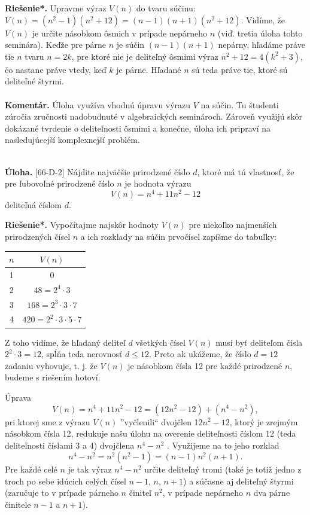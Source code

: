 \documentclass[11pt,a4paper,oneside,final]{book}
\newcommand{\kom}{\textbf{Komentár.} }
\newcommand{\ul}{\textbf{Úloha.} }
\newcommand{\rieh}{\textbf{Riešenie*.} }
\begin{document}
\rieh Upravme výraz $V(n)$ do tvaru súčinu: $V (n) = (n^2-1)(n^2+12)=(n-1)(n+1)(n^2+12)$. Vidíme, že $V(n)$ je určite násobkom ôsmich v prípade nepárneho $n$ (viď. tretia úloha tohto seminára). Keďže pre párne $n$ je súčin $(n-1)(n+1)$ nepárny, hľadáme práve tie $n$ tvaru $n = 2k$, pre ktoré nie je deliteľný ôsmimi výraz $n^2+ 12 = 4(k^2+ 3)$, čo nastane práve vtedy, keď $k$ je párne. Hľadané $n$ sú teda práve tie, ktoré sú deliteľné štyrmi.\\
\\
\kom Úloha využíva vhodnú úpravu výrazu $V$ na súčin. Tu študenti zúročia zručnosti nadobudnuté v algebraických seminároch. Zároveň využijú skôr dokázané tvrdenie o deliteľnosti ôsmimi a konečne, úloha ich pripraví na nasledujúcejší komplexnejší problém.\\
\\
\begin{tcolorbox}[breakable,notitle,boxrule=0pt,colback=light-gray,colframe=light-gray]\ul [66-D-2]
Nájdite najväčšie prirodzené číslo $d$, ktoré má tú vlastnosť, že pre ľubovoľné prirodzené číslo $n$ je hodnota výrazu $$V (n) = n^4+ 11n^2-12$$
deliteľná číslom $d$.

\end{tcolorbox}

\rieh Vypočítajme najskôr hodnoty $V (n)$ pre niekoľko najmenších prirodzených čísel $n$ a ich rozklady na súčin prvočísel zapíšme do tabuľky:
\begin{center}
\begin{tabular}{c c}
$n$ & $V (n) $\\
\hline
1 & 0\\
2 & $48 = 2^4 \cdot 3$\\
3 & $168 = 2^3 \cdot 3 \cdot 7$\\
4 & $420 = 2^2 \cdot 3 \cdot 5 \cdot 7$
\end{tabular}
\end{center}
Z toho vidíme, že hľadaný deliteľ $d$ všetkých čísel $V (n)$ musí byť deliteľom čísla $2^2 \cdot 3 = 12$, spĺňa teda nerovnosť $d \leq 12$. Preto ak ukážeme, že číslo $d = 12$ zadaniu vyhovuje, t. j. že $V (n)$ je násobkom čísla 12 pre každé prirodzené $n$, budeme s riešením hotoví.

Úprava $$V (n) = n^4+ 11n^2 - 12 = (12n^2 - 12) + (n^4 - n^2),$$ pri ktorej sme z výrazu $V (n)$ ”vyčlenili“ dvojčlen 1$2n^2 -12$, ktorý je zrejmým násobkom čísla 12, redukuje našu úlohu na overenie deliteľnosti číslom 12 (teda deliteľnosti číslami 3 a 4) dvojčlena $n^4 - n^2$ . Využijeme na to jeho rozklad $$n^4 - n^2 = n^2(n^2 - 1) = (n - 1)n^2(n + 1).$$
Pre každé celé $n$ je tak výraz $n^4 - n^2$ určite deliteľný tromi (také je totiž jedno z troch
po sebe idúcich celých čísel $n - 1$, $n$, $n + 1$) a súčasne aj deliteľný štyrmi (zaručuje to
v prípade párneho $n$ činiteľ $n^2$, v prípade nepárneho $n$ dva párne činitele $n-1$ a $n+1$).
\end{document}

